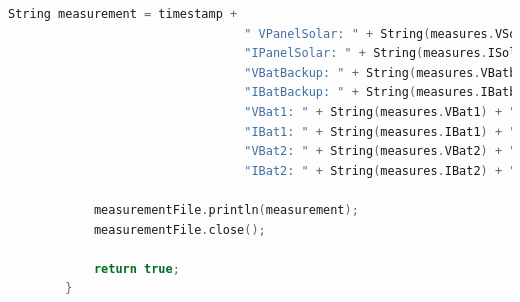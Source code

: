 \begin{itemize}
\begin{lstlisting}[captionpos=b, caption={Funcion \texttt{Write\_file}}, language=c++]
            String measurement = timestamp +
                                 " VPanelSolar: " + String(measures.VSolar) + " V, " +
                                 "IPanelSolar: " + String(measures.ISolar) + " mA, " +
                                 "VBatBackup: " + String(measures.VBatbu) + " V, " +
                                 "IBatBackup: " + String(measures.IBatbu) + " mA, " +
                                 "VBat1: " + String(measures.VBat1) + " V, " +
                                 "IBat1: " + String(measures.IBat1) + " mA, " +
                                 "VBat2: " + String(measures.VBat2) + " V, " +
                                 "IBat2: " + String(measures.IBat2) + " mA";

            measurementFile.println(measurement);
            measurementFile.close();

            return true;
        }
    \end{lstlisting}
\end{itemize}